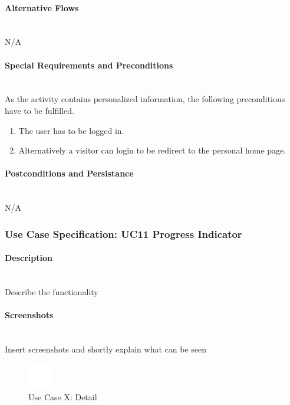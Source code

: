 \paragraph*{Alternative Flows}\mbox{}\\
N/A

\paragraph*{Special Requirements and Preconditions}\mbox{}\\
As the activity contains personalized information, the following preconditions have to be fulfilled.
\begin{enumerate}
	\vspace{-3mm}
	\setlength\itemsep{-1em}
	\item The user has to be logged in.
	\item Alternatively a visitor can login to be redirect to the personal home page.
\end{enumerate}

\paragraph*{Postconditions and Persistance}\mbox{}\\
N/A

\newpage
\subsubsection{Use Case Specification: \ac{UC}11 Progress Indicator}
\label{sec:domainBbl}

\paragraph*{Description}\mbox{}\\
Describe the functionality

\paragraph*{Screenshots}\mbox{}\\
Insert screenshots and shortly explain what can be seen
\begin{figure}[h] 
	\centering
	\includegraphics[width=0.1\textwidth]{Content/Domain/placeholder.png}
	\caption{Use Case X: Detail}
	\label{fig:label8}
\end{figure}

